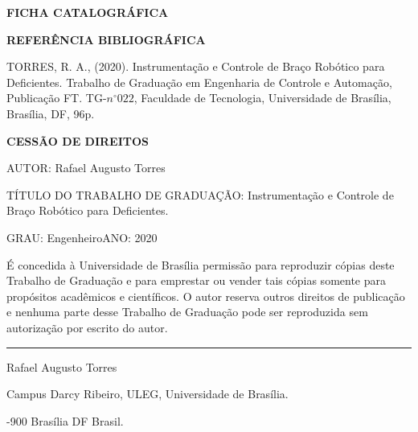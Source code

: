 \noindent \textbf{FICHA CATALOGRÁFICA}

\noindent %

\noindent \medskip{}


\noindent \textbf{REFERÊNCIA BIBLIOGRÁFICA}

TORRES, R. A., (2020). Instrumentação e Controle de Braço Robótico para Deficientes. Trabalho de Graduação
em Engenharia de Controle e Automação, Publicação FT. TG-$n^{\circ}022$,
Faculdade de Tecnologia, Universidade de Brasília, Brasília, DF, 96p.

\noindent \bigskip{}


\noindent \textbf{CESSÃO DE DIREITOS}

\noindent AUTOR: Rafael Augusto Torres

TÍTULO DO TRABALHO DE GRADUAÇÃO: Instrumentação e Controle de Braço Robótico para Deficientes.

\noindent \medskip{}


\noindent GRAU: Engenheiro\hfill{}ANO: 2020\hfill{}

\noindent \medskip{}


É concedida à Universidade de Brasília permissão para reproduzir cópias
deste Trabalho de Graduação e para emprestar ou vender tais cópias
somente para propósitos acadêmicos e científicos. O autor reserva
outros direitos de publicação e nenhuma parte desse Trabalho de Graduação
pode ser reproduzida sem autorização por escrito do autor.

\noindent \bigskip{}


\noindent \rule[0.5ex]{1\columnwidth}{1pt}

\noindent Rafael Augusto Torres

\noindent Campus Darcy Ribeiro, ULEG, Universidade de Brasília.

-900 Brasília \textendash{} DF \textendash{} Brasil.
